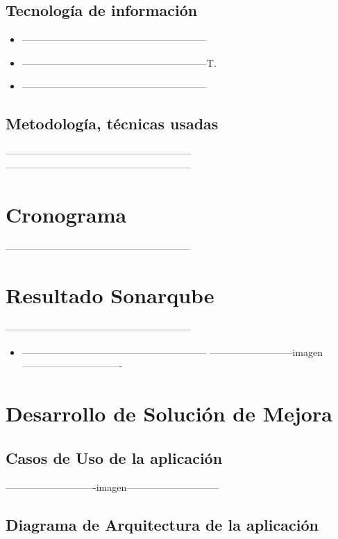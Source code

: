 \documentclass[preprint,12pt]{elsarticle}
\begin{document}
\subsection{\textbf{Tecnología de información  }}
		\begin{itemize}
	\item ---------------------------------------------------------
	\item 	---------------------------------------------------------T.
	\item 	---------------------------------------------------------
	\end{itemize}
\subsection{\textbf{ Metodología, técnicas usadas  }}
---------------------------------------------------------
---------------------------------------------------------
		
\section{Cronograma }

---------------------------------------------------------

\section{Resultado Sonarqube}
	---------------------------------------------------------
	\begin{itemize}
	    \item ---------------------------------------------------------
--------------------------imagen-------------------------------

	
	\end{itemize}
\section{Desarrollo de Solución de Mejora}
\subsection{\textbf{ Casos de Uso de la aplicación}}
----------------------------imagen-----------------------------
\subsection{\textbf{ Diagrama de Arquitectura de la aplicación }}
\end{document}
